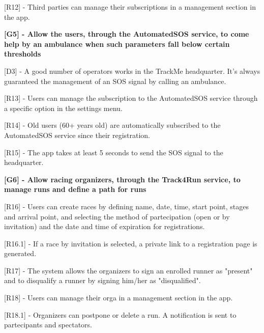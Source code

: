[R12] - Third parties can manage their subscriptions in a management section in the app. \newline

\hspace{-\parindent}\textbf{[G5] - Allow the users, through the AutomatedSOS service, to come help by an ambulance when such parameters fall below certain thresholds} \newline

[D3] - A good number of operators works in the TrackMe headquarter. It's always guaranteed the management of an SOS signal by calling an ambulance. \newline

[R13] - Users can manage the subscription to the AutomatedSOS service through a specific option in the settings menu. \newline

[R14] - Old users (60+ years old) are automatically subscribed to the AutomatedSOS service since their registration. \newline

[R15] - The app takes at least 5 seconds to send the SOS signal to the headquarter. \newline

\hspace{-\parindent}\textbf{[G6] - Allow racing organizers, through the Track4Run service, to manage runs and define a path for runs} \newline

[R16] - Users can create races by defining name, date, time, start point, stages and arrival point, and selecting the method of partecipation (open or by invitation) and the date and time of expiration for registrations. \newline

\hspace{\parindent}[R16.1] - If a race by invitation is selected, a private link to a registration page is generated. \newline

[R17] - The system allows the organizers to sign an enrolled runner as "present" and to disqualify a runner by signing him/her as "disqualified". \newline

[R18] - Users can manage their orga in a management section in the app. \newline

\hspace{\parindent}[R18.1] - Organizers can postpone or delete a run. A notification is sent to partecipants and spectators. \newline

